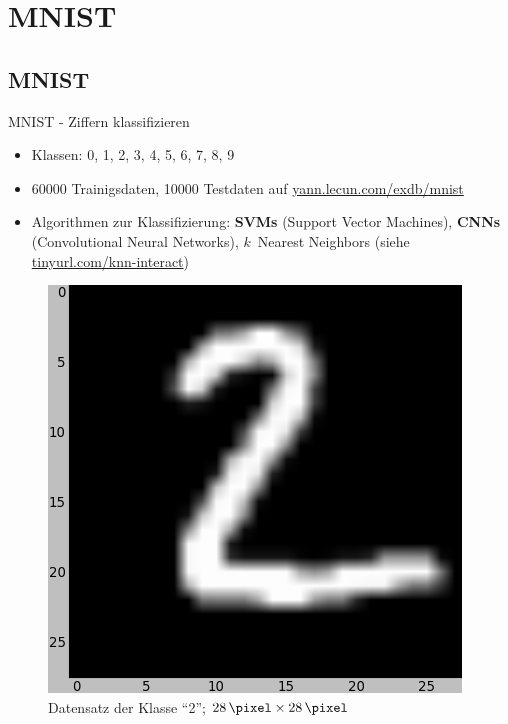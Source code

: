 \documentclass{beamer}
\begin{document}
\section{MNIST}
\subsection{MNIST}
\begin{frame}{MNIST - Ziffern klassifizieren}
    \begin{minipage}[b]{0.45\linewidth}
        \begin{itemize}
            \item Klassen: 0, 1, 2, 3, 4, 5, 6, 7, 8, 9
            \item \num{60000} Trainigsdaten, \num{10000} Testdaten
                  auf \href{http://yann.lecun.com/exdb/mnist/}{yann.lecun.com/exdb/mnist}
            \item Algorithmen zur Klassifizierung: \textbf{SVMs} (Support Vector Machines),
                  \textbf{CNNs} (Convolutional Neural Networks),
                  $k$~Nearest Neighbors (siehe \href{http://martin-thoma.com/k-nearest-neighbor-classification-interactive-example/}{tinyurl.com/knn-interact})
        \end{itemize}
    \end{minipage}
    \hspace{0.5cm}
    \begin{minipage}[b]{0.45\linewidth}
        \begin{figure}
            \centering
            \includegraphics[width=\textwidth]{../images/mnist-2.png}
            \caption{Datensatz der Klasse \enquote{2}; $\SI{28}{\pixel} \times \SI{28}{\pixel}$}
            \label{fig:spline}
        \end{figure}
    \end{minipage}
\end{frame}
\end{document}
